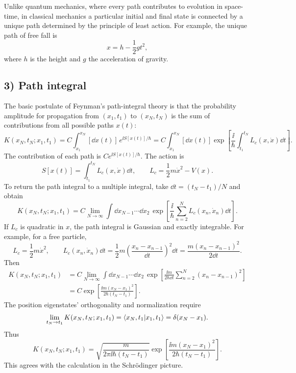 Unlike quantum mechanics, where every path contributes to evolution in space-time, in classical mechanics a particular initial and final state is connected by a unique path determined by the principle of least action. For example, the unique path of free fall is
\begin{equation}
x=h-\frac12gt^2,
\end{equation}
where $h$ is the height and $g$ the acceleration of gravity.

\subsection*{3) Path integral}
The basic postulate of Feynman's path-integral theory is that the probability amplitude for propagation from $(x_1,t_1)$ to $(x_N,t_N)$ is the sum of contributions from all possible paths $x(t)$:
\begin{equation}
\boxed{K(x_N,t_N;x_1,t_1)
=C\int_{x_1}^{x_N}[\dd x(t)]\,e^{\ii S[x(t)]/\hbar}
=C\int_{x_1}^{x_N}[\dd x(t)]
\exp\left[\frac\ii\hbar\int_{t_1}^{t_N}L_c(x,\dot x)\dd t\right].}
\end{equation}
The contribution of each path is $Ce^{\ii S[x(t)]/\hbar}$. The action is
\begin{equation}
S[x(t)]=\int_{t_1}^{t_N}L_c(x,\dot x)\dd t,\qquad
L_c=\frac12m\dot x^2-V(x).
\end{equation}
To return the path integral to a multiple integral, take $\dd t=(t_N-t_1)/N$ and obtain
\begin{equation}
K(x_N,t_N;x_1,t_1)=C\lim_{N\to\infty}
\int\dd x_{N-1}\cdots\dd x_2\,
\exp\left[\frac\ii\hbar\sum_{n=2}^{N}L_c(x_n,\dot x_n)\dd t\right].
\end{equation}
If $L_c$ is quadratic in $x$, the path integral is Gaussian and exactly integrable. For example, for a free particle,
\begin{equation}
L_c=\frac12m\dot x^2,\qquad
L_c(x_n,\dot x_n)\dd t=\frac12m\left(\frac{x_n-x_{n-1}}{\dd t}\right)^2\dd t
=\frac{m(x_n-x_{n-1})^2}{2\dd t}.
\end{equation}
Then
\begin{equation}
\begin{split}
K(x_N,t_N;x_1,t_1)
&=C\lim_{N\to\infty}\int\dd x_{N-1}\cdots\dd x_2\,
\exp\left[\frac{\ii m}{2\hbar\dd t}
\sum_{n=2}^{N}(x_n-x_{n-1})^2\right]\\
&=C\exp\left[\frac{\ii m(x_N-x_1)^2}{2\hbar(t_N-t_1)}\right].
\end{split}
\end{equation}
The position eigenstates' orthogonality and normalization require
\begin{equation}
\lim_{t_N\to t_1}K(x_N,t_N;x_1,t_1)
=\left\langle x_N,t_1\middle|x_1,t_1\right\rangle=\delta(x_N-x_1).
\end{equation}
Thus
\begin{equation}
\boxed{K(x_N,t_N;x_1,t_1)
=\sqrt{\frac{m}{2\pi\ii\hbar(t_N-t_1)}}
\exp\left[\frac{\ii m(x_N-x_1)^2}{2\hbar(t_N-t_1)}\right].}
\end{equation}
This agrees with the calculation in the Schr\"odinger picture.

